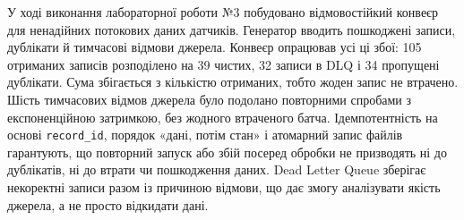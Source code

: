  У ході виконання лабораторної роботи №3 побудовано відмовостійкий конвеєр для ненадійних потокових даних датчиків. Генератор вводить пошкоджені записи, дублікати й тимчасові відмови джерела. Конвеєр опрацював усі ці збої: 105 отриманих записів розподілено на 39 чистих, 32 записи в DLQ і 34 пропущені дублікати. Сума збігається з кількістю отриманих, тобто жоден запис не втрачено. Шість тимчасових відмов джерела було подолано повторними спробами з експоненційною затримкою, без жодного втраченого батча. Ідемпотентність на основі \texttt{record\_id}, порядок «дані, потім стан» і атомарний запис файлів гарантують, що повторний запуск або збій посеред обробки не призводять ні до дублікатів, ні до втрати чи пошкодження даних. Dead Letter Queue зберігає некоректні записи разом із причиною відмови, що дає змогу аналізувати якість джерела, а не просто відкидати дані.



